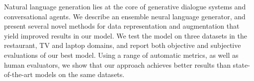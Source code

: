 Natural language generation lies at the core of generative dialogue systems and conversational agents. We describe an ensemble neural language generator, and present several novel methods for data representation and augmentation that yield improved results in our model. We test the model on three datasets in the restaurant, TV and laptop domains, and report both objective and subjective evaluations of our best model. Using a range of automatic metrics, as well as human evaluators, we show that our approach achieves better results than state-of-the-art models on the same datasets.
